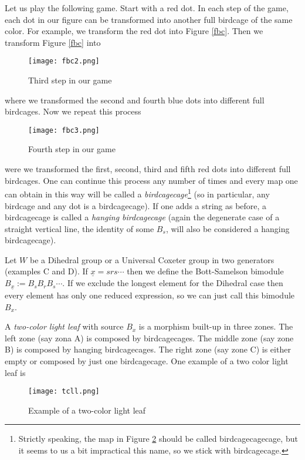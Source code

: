 \documentclass[12pt]{wart}
\theoremstyle{remark}
\begin{document}
Let us play the following game. Start with a red dot. In each step of the game, each dot in our figure can be transformed into another full birdcage of the same color. For example, we transform the red dot into Figure  \ref{fbc}. Then we transform Figure \ref{fbc} into  
\begin{figure}[H] \begin{center}
 \texttt{[image: fbc2.png]} 
\end{center}
\caption{Third step in our game}  
\label{fbc2}
\end{figure} 
where we transformed the second and fourth blue dots into different full birdcages. Now we repeat this process
\begin{figure}[H] \begin{center}
 \texttt{[image: fbc3.png]} 
\end{center}
\caption{Fourth step in our game}  
\label{fbc3}
\end{figure} 
were we transformed the first, second, third and fifth red dots into different full birdcages. One can continue this process any number of times and every map one can obtain in this way will be called a \emph{birdcagecage}\footnote{Strictly speaking, the map in Figure \ref{fbc3} should be called birdcagecagecage, but it seems to us a bit impractical this name, so we stick with  birdcagecage.} (so in particular, any birdcage and any dot is a birdcagecage). If one adds a string as before, a birdcagecage is called a \emph{hanging birdcagecage} (again the degenerate case of a straight vertical line, the identity of some $B_s$, will also be considered a hanging birdcagecage).  

Let $W$ be a Dihedral group or a Universal Coxeter group in two generators (examples C and D).  If $\underline{x}= srs\cdots$ then we define the Bott-Samelson bimodule $B_{\underline{x}}:=B_sB_rB_s\cdots$. If we exclude the longest element for the Dihedral case then every element has only one reduced expression, so we can just call this bimodule $B_x$.

A  \emph{two-color light leaf} with source $B_x$ is a morphism built-up in three zones. The left zone (say zona A) is composed by birdcagecages. The middle zone (say zone B) is composed by hanging birdcagecages. The right zone (say zone C) is either empty or composed by just one birdcagecage. 
One example of a two color light leaf is
\begin{figure}[H] \begin{center}
 \texttt{[image: tcll.png]} 
\end{center}
\caption{Example of a two-color light leaf}  
\label{tcll}
\end{figure} 
\end{document}
